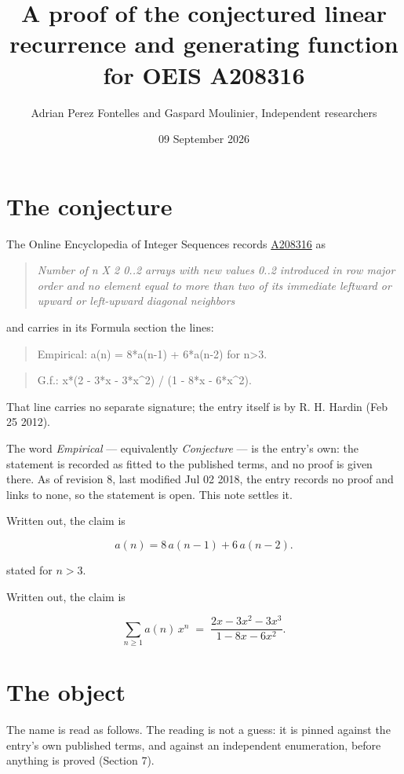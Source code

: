 \documentclass[11pt]{article}
\title{A proof of the conjectured linear recurrence and generating function for OEIS A208316}
\author{Adrian Perez Fontelles and Gaspard Moulinier, Independent researchers}
\date{09 September 2026}
\theoremstyle{definition}
\begin{document}
\maketitle
\section{The conjecture}

The Online Encyclopedia of Integer Sequences records \href{https://oeis.org/A208316}{A208316} as

\begin{quote}\itshape Number of n X 2 0..2 arrays with new values 0..2 introduced in row major order and no element equal to more than two of its immediate leftward or upward or left-upward diagonal neighbors\end{quote}

and carries in its Formula section the lines:

\begin{quote}\ttfamily Empirical: a(n) = 8*a(n-1) + 6*a(n-2) for n>3.\end{quote}

\begin{quote}\ttfamily G.f.: x*(2 - 3*x - 3*x\textasciicircum{}2) / (1 - 8*x - 6*x\textasciicircum{}2).\end{quote}

That line carries no separate signature; the entry itself is by R. H. Hardin (Feb 25 2012).

The word {\itshape Empirical} --- equivalently {\itshape Conjecture} --- is the entry's own: the statement is recorded as fitted to the published terms, and no proof is given there. As of revision 8, last modified Jul 02 2018, the entry records no proof and links to none, so the statement is open. This note settles it.

Written out, the claim is

\[a(n) = 8\,a(n-1) + 6\,a(n-2).\]

stated for $n > 3$.

Written out, the claim is

\[\sum_{n \ge 1} a(n)\,x^n \;=\; \frac{2x - 3x^{2} - 3x^{3}}{1 - 8x - 6x^{2}}.\]

\section{The object}

The name is read as follows. The reading is not a guess: it is pinned against the entry's own published terms, and against an independent enumeration, before anything is proved (Section 7).
\end{document}
